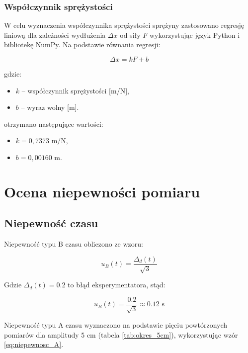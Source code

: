 \documentclass[a4paper,12pt]{article}
\begin{document}
\subsubsection{Współczynnik sprężystości}

W celu wyznaczenia współczynnika sprężystości sprężyny zastosowano regresję liniową dla zależności wydłużenia $\Delta x$ od siły $F$ wykorzystując język Python i bibliotekę NumPy. Na podstawie równania regresji:

\begin{equation*}
    \Delta x = kF + b
\end{equation*}

gdzie:
\begin{itemize}
    \setlength{\itemsep}{0em}
    \item $k$ -- współczynnik sprężystości [m/N],
    \item $b$ -- wyraz wolny [m].
\end{itemize}

otrzymano następujące wartości:
\begin{itemize}
    \setlength{\itemsep}{0em}
    \item $k = 0,7373$ m/N,
    \item $b = 0,00160$ m.
\end{itemize}


\section{Ocena niepewności pomiaru}

\subsection{Niepewność czasu}

Niepewność typu B czasu obliczono ze wzoru:

\begin{equation*}
    u_B(t) = \frac{\Delta_d(t)}{\sqrt{3}}
\end{equation*}

Gdzie $\Delta_d(t) = 0.2$ to błąd eksperymentatora, stąd:

\begin{equation*}
    u_B(t) = \frac{0.2}{\sqrt{3}} \approx 0.12 \text{ s}
\end{equation*}

Niepewność typu A czasu wyznaczono na podstawie pięciu powtórzonych pomiarów dla amplitudy 5 cm (tabela \ref{tab:okres_5cm}), wykorzystując wzór \ref{eq:niepewnosc_A}.
\end{document}
